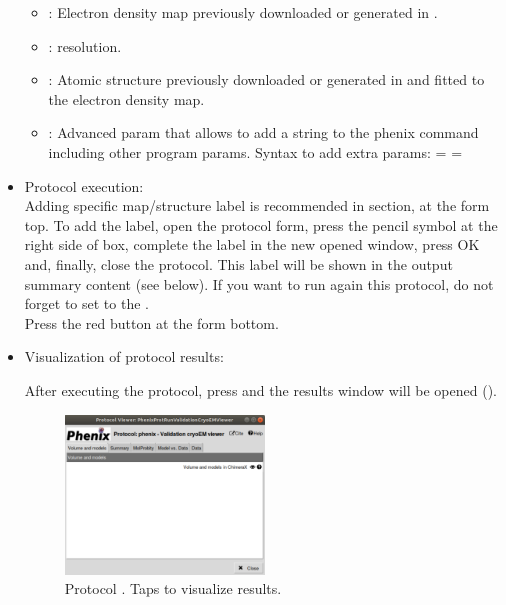 \begin{itemize}
    \begin{itemize}
     \item {}: Electron density map previously downloaded or generated in \scipion.
     \item {}:  resolution.
     \item {}: Atomic structure previously downloaded or generated in \scipion and fitted to the electron density map.
     \item {}: Advanced param that allows to add a string to the phenix command including other  program params. Syntax to add extra params:  =   = 
    \end{itemize}
 
 \item Protocol execution:\\
 Adding specific map/structure label is recommended in  section, at the form top. To add the label, open the protocol form, press the pencil symbol at the right side of  box, complete the label in the new opened window, press OK and, finally, close the protocol. This label will be shown in the output summary content (see below). If you want to run again this protocol, do not forget to set to  the .\\
  Press the  red button at the form bottom.
  
 \item Visualization of protocol results:
 
 After executing the protocol, press  and the results window will be opened (). 
  
    \begin{figure}[H]
     \centering 
     \captionsetup{width=.9\linewidth} 
     \includegraphics[width=0.50\textwidth]{Images_appendix/Fig200.pdf}
     \caption{Protocol . Taps to visualize  results.}
     \label{fig:validationCryoEM_protocol_2}
    \end{figure}
    

\end{itemize}
